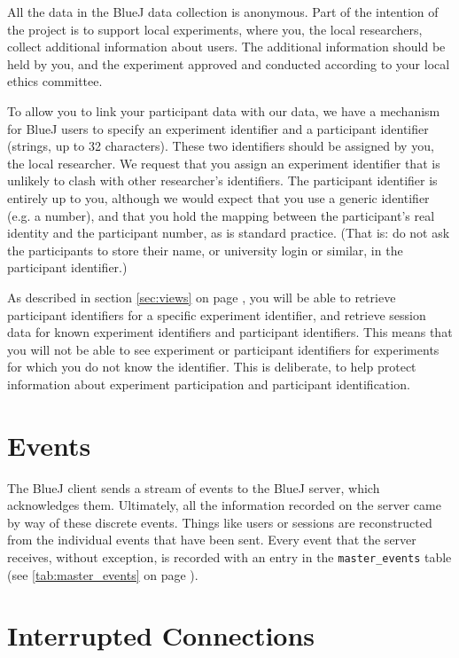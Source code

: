 \documentclass{report}
\newcommand{\myref}[1]{\autoref{#1} on page \pageref*{#1}}
\newcommand{\tabref}[1]{\lstinline|#1| table (see \myref{tab:#1})}
\begin{document}
All the data in the BlueJ data collection is anonymous.  Part of the intention
of the project is to support local experiments, where you, the local
researchers, collect additional information about users.  The additional
information should be held by you, and the experiment approved and conducted
according to your local ethics committee.

To allow you to link your participant data with our data, we have a mechanism
for BlueJ users to specify an experiment identifier and a participant
identifier (strings, up to 32 characters).  These two identifiers should be
assigned by you, the local researcher.  We request that you assign an
experiment identifier that is unlikely to clash with other researcher's
identifiers.  The participant identifier is entirely up to you, although we
would expect that you use a generic identifier (e.g. a number), and that you
hold the mapping between the participant's real identity and the participant
number, as is standard practice.  (That is: do not ask the participants to store their name, or
university login or similar, in the participant identifier.)

As described in section \myref{sec:views}, you will be able to retrieve
participant identifiers for a specific experiment identifier, and retrieve
session data for known experiment identifiers and participant identifiers.
This means that you will not be able to see experiment or participant
identifiers for experiments for which you do  not know the identifier.  This
is deliberate, to help protect information about experiment participation and
participant identification.

\section{Events}

The BlueJ client sends a stream of events to the BlueJ server, which
acknowledges them.  Ultimately, all the information recorded on the server
came by way of these discrete events.  Things like users or sessions are
reconstructed from the individual events that have been sent.  Every event
that the server receives, without exception, is recorded with an entry in the \tabref{master_events}.

\section{Interrupted Connections}
\label{def:interruption}
\end{document}
